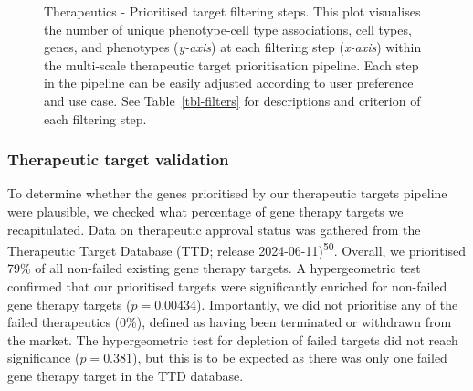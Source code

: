 \documentclass[
]{agujournal2019}
\begin{document}
\label{cell-fig-therapy-filter}
\begin{figure}[H]


\caption{\label{fig-therapy-filter}Therapeutics - Prioritised target
filtering steps. This plot visualises the number of unique
phenotype-cell type associations, cell types, genes, and phenotypes
(\emph{y-axis}) at each filtering step (\emph{x-axis}) within the
multi-scale therapeutic target prioritisation pipeline. Each step in the
pipeline can be easily adjusted according to user preference and use
case. See Table~\ref{tbl-filters} for descriptions and criterion of each
filtering step.}

\end{figure}%

\subsubsection{Therapeutic target
validation}\label{therapeutic-target-validation}

To determine whether the genes prioritised by our therapeutic targets
pipeline were plausible, we checked what percentage of gene therapy
targets we recapitulated. Data on therapeutic approval status was
gathered from the Therapeutic Target Database (TTD; release
2024-06-11)\textsuperscript{50}. Overall, we prioritised 79\% of all
non-failed existing gene therapy targets. A hypergeometric test
confirmed that our prioritised targets were significantly enriched for
non-failed gene therapy targets (\(p=0.00434\)). Importantly, we did not
prioritise any of the failed therapeutics (0\%), defined as having been
terminated or withdrawn from the market. The hypergeometric test for
depletion of failed targets did not reach significance (\(p=0.381\)),
but this is to be expected as there was only one failed gene therapy
target in the TTD database.
\end{document}
